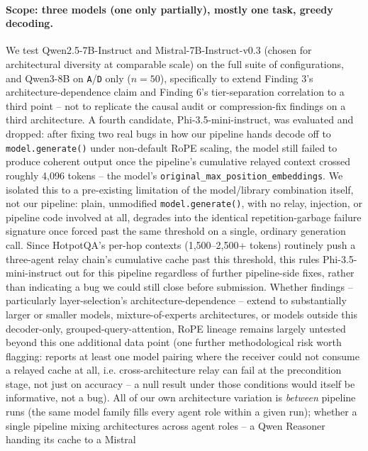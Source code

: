 \documentclass[11pt]{article}
\begin{document}
\paragraph{Scope: three models (one only partially), mostly one task,
greedy decoding.} We test Qwen2.5-7B-Instruct and Mistral-7B-Instruct-v0.3
(chosen for architectural diversity at comparable scale) on the full
suite of configurations, and Qwen3-8B on \texttt{A}/\texttt{D} only
($n=50$), specifically to extend Finding 3's architecture-dependence
claim and Finding 6's tier-separation correlation to a third point -- not
to replicate the causal audit or compression-fix findings on a third
architecture. A fourth candidate, Phi-3.5-mini-instruct, was evaluated
and dropped: after fixing two real bugs in how our pipeline hands decode
off to \texttt{model.generate()} under non-default RoPE scaling, the
model still failed to produce coherent output once the pipeline's
cumulative relayed context crossed roughly 4{,}096 tokens -- the model's
\texttt{original\_max\_position\_embeddings}. We isolated this to a
pre-existing limitation of the model/library combination itself, not our
pipeline: plain, unmodified \texttt{model.generate()}, with no relay,
injection, or pipeline code involved at all, degrades into the identical
repetition-garbage failure signature once forced past the same threshold
on a single, ordinary generation call. Since HotpotQA's per-hop contexts
(1{,}500--2{,}500+ tokens) routinely push a three-agent relay chain's
cumulative cache past this threshold, this rules Phi-3.5-mini-instruct
out for this pipeline regardless of further pipeline-side fixes, rather
than indicating a bug we could still close before submission. Whether
findings -- particularly layer-selection's architecture-dependence --
extend to substantially larger or smaller models, mixture-of-experts
architectures, or models outside this decoder-only,
grouped-query-attention, RoPE lineage remains largely untested beyond
this one additional data point (one further methodological risk worth
flagging: \citet{latentcommpay2026} reports at least one model pairing
where the receiver could not consume a relayed cache at all, i.e.
cross-architecture relay can fail at the precondition stage, not just on
accuracy -- a null result under those conditions would itself be
informative, not a bug). All of our own architecture variation is
\emph{between} pipeline runs (the same model family fills every agent
role within a given run); whether a single pipeline mixing architectures
across agent roles -- a Qwen Reasoner handing its cache to a Mistral
\end{document}
